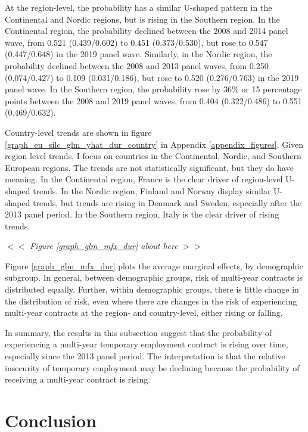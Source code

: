 \documentclass[12pt]{article}
\begin{document}
At the region-level, the probability has a similar U-shaped pattern in the Continental and Nordic regions, but is rising in the Southern region.  In the Continental region, the probability declined between the 2008 and 2014 panel wave, from 0.521 (0.439/0.602) to 0.451 (0.373/0.530), but rose to 0.547 (0.447/0.648) in the 2019 panel wave.  Similarly, in the Nordic region, the probability declined between the 2008 and 2013 panel waves, from 0.250 (0.074/0.427) to 0.109 (0.031/0.186), but rose to 0.520 (0.276/0.763) in the 2019 panel wave.  In the Southern region, the probability rose by 36\% or 15 percentage points between the 2008 and 2019 panel waves, from 0.404 (0.322/0.486) to 0.551 (0.469/0.632).  

Country-level trends are shown in figure \ref{graph_eu_silc_glm_yhat_dur_country} in Appendix \ref{appendix_figures}.  Given region level trends, I focus on countries in the Continental, Nordic, and Southern European regions.  The trends are not statistically significant, but they do have meaning.  In the Continental region, France is the clear driver of region-level U-shaped trends.  In the Nordic region, Finland and Norway display similar U-shaped trends, but trends are rising in Denmark and Sweden, especially after the 2013 panel period.  In the Southern region, Italy is the clear driver of rising trends.

\begin{center}
$<<$ \emph{Figure \ref{graph_glm_mfx_dur} about here} $>>$
\end{center}

Figure \ref{graph_glm_mfx_dur} plots the average marginal effects, by demographic subgroup.  In general, between demographic groups, risk of multi-year contracts is distributed equally.  Further, within demographic groups, there is little change in the distribution of risk, even where there are changes in the risk of experiencing multi-year contracts at the region- and country-level, either rising or falling.  

In summary, the results in this subsection suggest that the probability of experiencing a multi-year temporary employment contract is rising over time, especially since the 2013 panel period.  The interpretation is that the relative insecurity of temporary employment may be declining because the probability of receiving a multi-year contract is rising.

\section{Conclusion}
\end{document}
